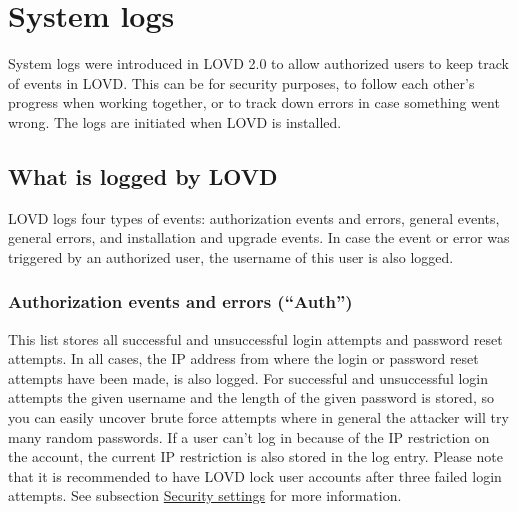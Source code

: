 \documentclass[a4paper,oneside,openany,12pt]{memoir}
\renewenvironment{leftbar}[1][\hsize]
{%
    \def\FrameCommand
    {%
        {\color{LOVDdark}\vrule width 3pt \hspace{5pt}}%
        \colorbox{LOVDlight}%
    }%
    \MakeFramed{\hsize#1\advance\hsize-\width\FrameRestore}%
}
{\endMakeFramed}
\begin{document}
\section{System logs}
System logs were introduced in LOVD 2.0 to allow authorized users to keep track of events in LOVD.
This can be for security purposes, to follow each other's progress when working together,
or to track down errors in case something went wrong.
The logs are initiated when LOVD is installed.



\subsection{What is logged by LOVD}
LOVD logs four types of events: authorization events and errors, general events, general errors, and installation and upgrade events.
In case the event or error was triggered by an authorized user, the username of this user is also logged.

\subsubsection{Authorization events and errors (``Auth'')}
This list stores all successful and unsuccessful login attempts and password reset attempts.
In all cases, the IP address from where the login or password reset attempts have been made, is also logged.
For successful and unsuccessful login attempts the given username and the length of the given password is stored,
 so you can easily uncover brute force attempts where in general the attacker will try many random passwords.
If a user can't log in because of the IP restriction on the account, the current IP restriction is also stored in the log entry.
Please note that it is recommended to have LOVD lock user accounts after three failed login attempts.
See subsection \hyperlink{ssec:security_settings}{Security settings} for more information.

\end{document}
